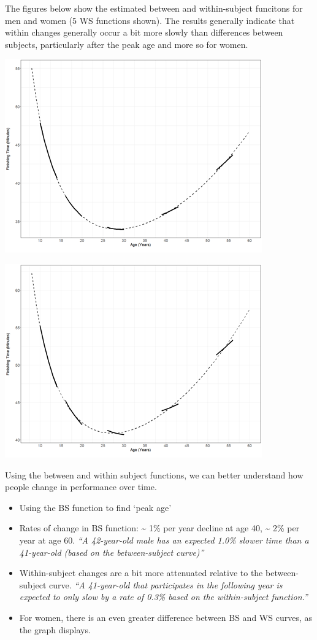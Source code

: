 \documentclass[
  9pt,
  ignorenonframetext,
]{beamer}
\begin{document}
\begin{frame}{}
\protect\hypertarget{section-8}{}
The figures below show the estimated between and within-subject
funcitons for men and women (5 WS functions shown). The results
generally indicate that within changes generally occur a bit more slowly
than differences between subjects, particularly after the peak age and
more so for women.

\begin{center}\includegraphics[width=0.4\linewidth]{figs_L19/f4} \end{center}

\begin{center}\includegraphics[width=0.4\linewidth]{figs_L19/f5} \end{center}
\end{frame}

\begin{frame}{}
\protect\hypertarget{section-9}{}
Using the between and within subject functions, we can better understand
how people change in performance over time.

\begin{itemize}
\item
  Using the BS function to find `peak age'
\item
  Rates of change in BS function: \textasciitilde{} 1\% per year decline
  at age 40, \textasciitilde{} 2\% per year at age 60. \emph{``A
  42-year-old male has an expected 1.0\% slower time than a 41-year-old
  (based on the between-subject curve)''}
\item
  Within-subject changes are a bit more attenuated relative to the
  between-subject curve. \emph{``A 41-year-old that participates in the
  following year is expected to only slow by a rate of 0.3\% based on
  the within-subject function.''}
\item
  For women, there is an even greater difference between BS and WS
  curves, as the graph displays.
\end{itemize}
\end{frame}
\end{document}
